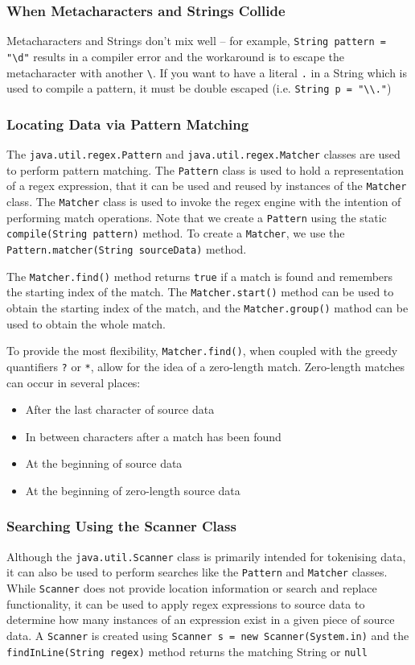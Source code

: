 \subsubsection{When Metacharacters and Strings Collide}
Metacharacters and Strings don't mix well -- for example,
\verb#String pattern = "\d"# results in a compiler error and the workaround is 
to escape the metacharacter with another \verb#\#. If you want to have a 
literal \verb#.# in a String which is used to compile a pattern, it must be 
double escaped (i.e. \verb#String p = "\\."#)

\subsubsection{Locating Data via Pattern Matching}
The \verb#java.util.regex.Pattern# and \verb#java.util.regex.Matcher# classes 
are used to perform pattern matching. The \verb#Pattern# class is used to hold 
a representation of a regex expression, that it can be used and reused by 
instances of the \verb#Matcher# class. The \verb#Matcher# class is used to 
invoke the regex engine with the intention of performing match operations. Note 
that we create a \verb#Pattern# using the static \verb#compile(String pattern)# 
method. To create a \verb#Matcher#, we use the
\verb#Pattern.matcher(String sourceData)# method.

The \verb#Matcher.find()# method returns \verb#true# if a match is found and 
remembers the starting index of the match. The \verb#Matcher.start()# method 
can be used to obtain the starting index of the match, and the 
\verb#Matcher.group()# mathod can be used to obtain the whole match.

To provide the most flexibility, \verb#Matcher.find()#, when coupled with the 
greedy quantifiers \verb#?# or \verb#*#, allow for the idea of a zero-length 
match. Zero-length matches can occur in several places:
\begin{itemize}
    \item After the last character of source data
    \item In between characters after a match has been found
    \item At the beginning of source data
    \item At the beginning of zero-length source data
\end{itemize}

\subsubsection{Searching Using the Scanner Class}
Although the \verb#java.util.Scanner# class is primarily intended for 
tokenising data, it can also be used to perform searches like the 
\verb#Pattern# and \verb#Matcher# classes. While \verb#Scanner# does not 
provide location information or search and replace functionality, it can be 
used to apply regex expressions to source data to determine how many instances 
of an expression exist in a given piece of source data. A \verb#Scanner# is 
created using \verb#Scanner s = new Scanner(System.in)# and the 
\verb#findInLine(String regex)# method returns the matching String or 
\verb#null#

